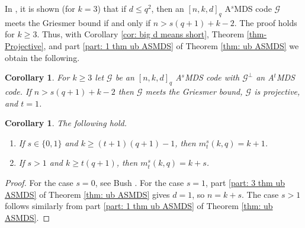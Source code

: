 \documentclass[11pt,a4paper]{amsart}
\newcommand{\AS}{ A$^s$MDS }
\newcommand{\G}{\mathcal{G}}
\theoremstyle{plain}
\newtheorem{corollary}[theorem]{Corollary}
\theoremstyle{definition}
\theoremstyle{remark}
\begin{document}
	In \cite{MR2158768}, it is shown (for $k=3$) that if $d\le q^2$, then an $[n,k,d]_q$ \AS code $\G$ meets the Griesmer bound if and only if $n> s(q+1)+k-2$. The proof holds for $k\ge 3$. Thus, with Corollary \ref{cor: big d means short}, Theorem \ref{thm-Projective}, and part \ref{part: 1 thm ub ASMDS} of Theorem \ref{thm: ub ASMDS} we obtain the following.

	\begin{corollary}\label{cor: long implies Griesmer}
		For $k\ge 3$ let $\G$ be an $[n,k,d]_q$ \AS code with $\G^\perp$ an A$^t$MDS code. If $n> s(q+1)+k-2$ then   $\G$ meets the Griesmer bound, $\G$ is projective, and $t=1$.
	\end{corollary}

	\begin{corollary}\label{cor: big k, k+s} The following hold.
		\begin{enumerate}
			\item If $s\in \{0,1\}$ and $k\ge (t+1)(q+1)-1$, then $m^s_t(k,q) = k+1$. \label{part 1: cor: big k, k+s}
			\item If $s>1$ and $k\ge t(q+1)$, then  $m^s_t(k,q) = k+s$. \label{part 2: cor: big k, k+s}
		\end{enumerate}
	\end{corollary}
	\begin{proof}
		For the case $s=0$, see Bush \cite{Bush1952}. For the case $s=1$,  part  \ref{part: 3 thm ub ASMDS} of Theorem \ref{thm: ub ASMDS} gives $d=1$, so $n=k+s$. The case $s>1$ follows similarly from part \ref{part: 1 thm ub ASMDS} of Theorem \ref{thm: ub ASMDS}.
	\end{proof}
\end{document}
